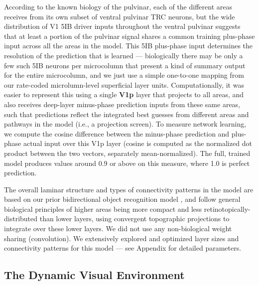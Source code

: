 \documentclass[11pt,twoside]{article}
\newif\myifpdf
\begin{document}
According to the known biology of the pulvinar, each of the different areas receives from its own subset of ventral pulvinar TRC neurons, but the wide distribution of V1 5IB driver inputs throughout the ventral pulvinar \cite{Shipp03} suggests that at least a portion of the pulvinar signal shares a common training plus-phase input across all the areas in the model.  This 5IB plus-phase input determines the resolution of the prediction that is learned --- biologically there may be only a few such 5IB neurons per microcolumn that present a kind of summary output for the entire microcolumn, and we just use a simple one-to-one mapping from our rate-coded microlumn-level superficial layer units.  Computationally, it was easier to represent this using a single {\bf V1p} layer that projects to all areas, and also receives deep-layer minus-phase prediction inputs from these same areas, such that predictions reflect the integrated best guesses from different areas and pathways in the model (i.e., a projection screen).  To measure network learning, we compute the cosine difference between the minus-phase prediction and plus-phase actual input over this V1p layer (cosine is computed as the normalized dot product between the two vectors, separately mean-normalized).  The full, trained model produces values around 0.9 or above on this measure, where 1.0 is perfect prediction.

The overall laminar structure and types of connectivity patterns in the model are based on our prior bidirectional object recognition model \cite{OReillyWyatteHerdEtAl13}, and follow general biological principles of higher areas being more compact and less retinotopically-distributed than lower layers, using convergent topographic projections to integrate over these lower layers. We did not use any non-biological weight sharing (convolution).  We extensively explored and optimized layer sizes and connectivity patterns for this model --- see Appendix for detailed parameters.

\subsection{The Dynamic Visual Environment}
\end{document}

